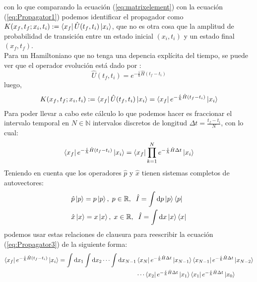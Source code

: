 \documentclass[11pt,a4paper]{article}
\begin{document}
con lo que comparando la ecuaci\'on (\ref{eq:matrixelement}) con la ecuaci\'on (\ref{eq:Propagator1}) podemos identificar el propagador como $K(x_f,t_f; x_i,t_i) := \bra{x_f}\hat{U}(t_f,t_i)\ket{x_i}$, que no es otra cosa que la amplitud de probabilidad de transici\'on entre un estado inicial $(x_i,t_i)$ y un estado final $(x_f,t_f)$. \\
Para un Hamiltoniano que no tenga una depencia expl\'icita del tiempo, se puede ver que el operador evoluci\'on est\'a dado por \cite{falomir2021integrales}:
\begin{equation}
\hat{U}(t_f,t_i) = e^{-\frac{i}{\hbar}\hat{H} (t_f - t_i)}
\label{eq:evolutionoperator}
\end{equation}
luego,
\begin{equation}
K(x_f,t_f; x_i,t_i) := \bra{x_f}\hat{U}(t_f,t_i)\ket{x_i} = \bra{x_f}e^{-\frac{i}{\hbar}\hat{H} (t_f - t_i)}\ket{x_i}
\label{eq:Propagator2}
\end{equation}
Para poder llevar a cabo este c\'alculo lo que podemos hacer es fraccionar el intervalo temporal en $N \in \mathbb{N}$ intervalos discretos de longitud $\Delta t = \frac{t_f - t_i}{N}$, con lo cual:
\begin{equation}
\bra{x_f}e^{-\frac{i}{\hbar}\hat{H} (t_f - t_i)}\ket{x_i} = \bra{x_f}\prod_{k=1}^N e^{-\frac{i}{\hbar}\hat{H}\Delta t}\ket{x_i}
\label{eq:Propagator3}
\end{equation}
Teniendo en cuenta que los operadores $\hat{p}$ y $\hat{x}$ tienen sistemas completos de autovectores:
\begin{equation}
\begin{split}
& \hat{p}\ket{p} = p\ket{p}, \; p \in \mathbb{R}, \; \; \hat{I} = \int \mathrm{d}p \ket{p}\bra{p} \\
& \hat{x}\ket{x} = x\ket{x}, \; x \in \mathbb{R}, \; \; \hat{I} = \int \mathrm{d}x \ket{x}\bra{x}
\end{split}
\label{eq:eigenvectors}
\end{equation}
podemos usar estas relaciones de clausura para reescribir la ecuaci\'on (\ref{eq:Propagator3}) de la siguiente forma:
\begin{equation}
\begin{split}
\bra{x_f}e^{-\frac{i}{\hbar}\hat{H} (t_f - t_i)}\ket{x_i} = \int \mathrm{d}x_1 \int \mathrm{d}x_2 \cdots \int \mathrm{d}x_{N-1} & \bra{x_N}e^{-\frac{i}{\hbar}\hat{H}\Delta t}\ket{x_{N-1}} \bra{x_{N-1}}e^{-\frac{i}{\hbar}\hat{H}\Delta t}\ket{x_{N-2}} \\
& \cdots \bra{x_2}e^{-\frac{i}{\hbar}\hat{H}\Delta t}\ket{x_1} \bra{x_1}e^{-\frac{i}{\hbar}\hat{H}\Delta t}\ket{x_0}
\end{split}
\label{eq:Propagator4}
\end{equation}
\end{document}

